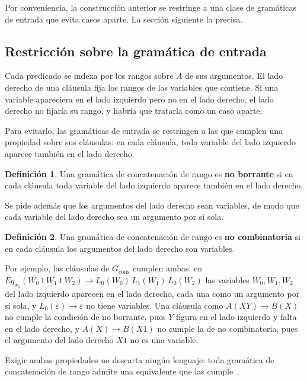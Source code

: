 \documentclass{report}
\theoremstyle{definition}
\newtheorem{definicion}{Definición}[chapter]
\theoremstyle{plain}
\begin{document}
Por conveniencia, la construcción anterior se restringe a una clase
de gramáticas de entrada que evita casos aparte. La sección siguiente
la precisa.

\subsection{Restricción sobre la gramática de entrada}

Cada predicado se indexa por los rangos sobre $A$ de sus argumentos.
El lado derecho de una cláusula fija los rangos de las variables que
contiene. Si una variable apareciera en el lado izquierdo pero no en el
lado derecho, el lado derecho no fijaría su rango, y habría que tratarla como un
caso aparte.

Para evitarlo, las gramáticas de entrada se restringen a las que
cumplen una propiedad sobre sus cláusulas: en cada cláusula, toda
variable del lado izquierdo aparece también en el lado derecho.

\begin{definicion}
Una gramática de concatenación de rango es \textbf{no borrante}
si en cada cláusula toda variable del lado izquierdo aparece también en el
lado derecho.
\end{definicion}

Se pide además que los argumentos del lado derecho sean variables, de modo
que cada variable del lado derecho sea un argumento por sí sola.

\begin{definicion}
Una gramática de concatenación de rango es \textbf{no combinatoria} si
en cada cláusula los argumentos del lado derecho son variables.
\end{definicion}

Por ejemplo, las cláusulas de $G_{\mathrm{cons}}$ cumplen ambas: en
$Eq_{x_1}(W_0\,1\,W_1\,1\,W_2) \to L_0(W_0)\,L_1(W_1)\,L_0(W_2)$ las
variables $W_0, W_1, W_2$ del lado izquierdo aparecen en el lado derecho,
cada una como un argumento por sí sola, y $L_0(\varepsilon) \to
\varepsilon$ no tiene variables. Una cláusula como $A(XY) \to B(X)$ no
cumple la condición de no borrante, pues $Y$ figura en el lado izquierdo
y falta en el lado derecho, y $A(X) \to B(X1)$ no cumple la de no
combinatoria, pues el argumento del lado derecho $X1$ no es una variable.

Exigir ambas propiedades no descarta ningún lenguaje: toda gramática de
concatenación de rango admite una equivalente que las
cumple~\cite{boullier1998proposal, kallmeyer2010parsing}.
\end{document}
